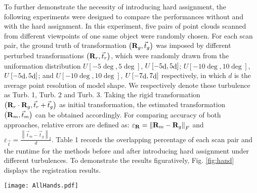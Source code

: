 \documentclass[review]{elsarticle}
\begin{document}
To further demonstrate the necessity of introducing hard assignment, the following experiments were designed to compare the performances without and with the hard assignment. In this experiment, five pairs of point clouds scanned from different viewpoints of one same object were randomly chosen. For each scan pair, the ground truth of transformation $\left( {{{\bf{R}}_g},{{\vec t }_g}} \right)$ was imposed by different perturbed transformations $\left( {{{\bf{R}}_r},{{\vec t }_r}} \right)$,  which were randomly drawn from the uniformation distribution $U\left[ { - 5\deg ,5\deg } \right]$, $U\left[ { - 5{\mathop{\rm d}\nolimits} ,5{\mathop{\rm d}\nolimits} } \right]$; $U\left[ { - 10\deg ,10\deg } \right]$, $U\left[ { - 5{\mathop{\rm d}\nolimits} ,5{\mathop{\rm d}\nolimits} } \right]$; and $U\left[ { - 10\deg ,10\deg } \right]$, $U\left[ { - 7{\mathop{\rm d}\nolimits} ,7{\mathop{\rm d}\nolimits} } \right]$ respectively, in which $d$ is the average point resolution of model shape. We respectively denote these turbulence as Turb. 1, Turb. 2 and Turb. 3. Taking the rigid transformation $\left( {{{\bf{R}}_r} \cdot {{\bf{R}}_g},{{\vec t }_r} + {{\vec t }_g}} \right)$ as initial transformation, the estimated transformation $\left( {{{\bf{R}}_m},{{\vec t }_m}} \right)$ can be obtained accordingly. For comparing accuracy of both approaches, relative errors are defined as: ${\varepsilon _{\bf{R}}} = {\left\| {{{\bf{R}}_m} - {{\bf{R}}_g}} \right\|_F}$ and ${\varepsilon _{\vec t }} = \frac{{{{\left\| {{{\vec t }_m} - {{\vec t }_g}} \right\|}_2}}}{d}$. Table 1 records the overlapping percentage of each scan pair and the runtime for the methods before and after introducing hard assignment under different turbulences. To demonstrate the results figuratively, Fig. \ref{fig:hand} displays the registration results.




\begin{figure*}[t]
\centering

\centerline{\texttt{[image: AllHands.pdf]}}

\caption{ Registration results for five pairs of clouds. (a) Registration results under ground truth. (b) Registration results of BdICP under Turb. 1. (c) Registration results of BdICP under Turb. 2. (d)Registration results of BdICP under Turb. 3. (e) Registration results of the proposed approach under Turb. 1. (f) Registration results of the proposed approach under Turb. 2. (g) Registration results of the proposed approach under Turb. 3.}\medskip
\label{fig:hand}

\end{figure*}
\end{document}
